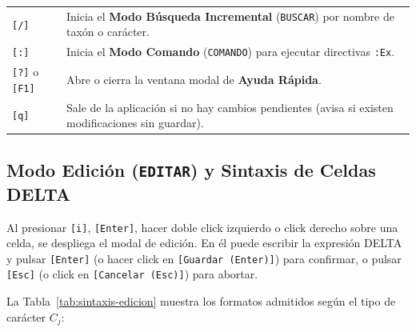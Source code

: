 \documentclass[11pt,a4paper]{article}
\newcommand{\keystroke}[1]{\texttt{[#1]}}
\begin{document}
\begin{table}[ht]
\begin{tabularx}{\textwidth}{@{}l X@{}}
\keystroke{/} & Inicia el \textbf{Modo Búsqueda Incremental} (\texttt{BUSCAR}) por nombre de taxón o carácter. \\
\keystroke{:} & Inicia el \textbf{Modo Comando} (\texttt{COMANDO}) para ejecutar directivas \texttt{:Ex}. \\
\keystroke{?} o \keystroke{F1} & Abre o cierra la ventana modal de \textbf{Ayuda Rápida}. \\
\keystroke{q} & Sale de la aplicación si no hay cambios pendientes (avisa si existen modificaciones sin guardar). \\
\bottomrule
\end{tabularx}
\end{table}

\subsection{Modo Edición (\texttt{EDITAR}) y Sintaxis de Celdas DELTA}
Al presionar \keystroke{i}, \keystroke{Enter}, hacer doble click izquierdo o click derecho sobre una celda, se despliega el modal de edición. En él puede escribir la expresión DELTA y pulsar \keystroke{Enter} (o hacer click en \texttt{[Guardar (Enter)]}) para confirmar, o pulsar \keystroke{Esc} (o click en \texttt{[Cancelar (Esc)]}) para abortar.

La Tabla~\ref{tab:sintaxis-edicion} muestra los formatos admitidos según el tipo de carácter $C_j$:
\end{document}
